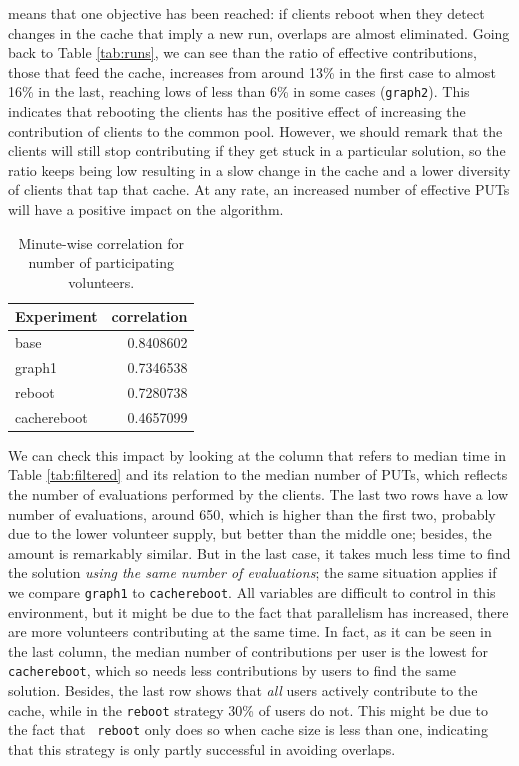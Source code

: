 \documentclass[runningheads,a4paper]{llncs}\usepackage[]{graphicx}\usepackage[]{color}
\newenvironment{knitrout}{}{} %
\begin{document}
means that one objective has been reached: if clients reboot when they
detect changes in the cache that imply a new run, overlaps are almost
eliminated. Going back to Table \ref{tab:runs}, we can see than the
ratio of effective contributions, those that feed the cache, increases
from around 13\% in the first case to almost 16\% in the last,
reaching lows of less than 6\% in some cases ({\tt graph2}). This
indicates that rebooting the clients has the positive effect of
increasing the contribution of clients to the common pool. However, we
should remark that the clients will still stop contributing if they
get stuck in a particular solution, so the ratio keeps being low
resulting in a slow change in the cache and a lower diversity of
clients that tap that cache. At any rate, an increased number of
effective PUTs will have a positive impact on the algorithm.

\begin{table}[htbp]
  \caption{Minute-wise correlation for number of participating volunteers. \label{tab:correlation}}
\begin{center}
\begin{knitrout}
\color{fgcolor}
\begin{tabular}{l|r}
\hline
Experiment & correlation\\
\hline
base & 0.8408602\\
\hline
graph1 & 0.7346538\\
\hline
reboot & 0.7280738\\
\hline
cachereboot & 0.4657099\\
\hline
\end{tabular}


\end{knitrout}
\end{center}
\end{table}
%
We can check this impact by looking at the column that refers to
median time in Table \ref{tab:filtered} and its relation to the median
number of PUTs, which reflects the number of evaluations performed by
the clients. The last two rows have a low number of evaluations,
around 650, which is higher than the first two, probably due to the
lower volunteer supply, but better than the middle one; besides, the
amount is remarkably similar. But in the last case, it takes much less
time to find the solution {\em using the same number of
  evaluations}; the same situation applies if we compare {\tt graph1}
to {\tt cachereboot}. All variables are difficult to control in this
environment, but it might be due to the fact that parallelism has
increased, there are more volunteers contributing at the same time. In
fact, as it can be seen in the last column, the median number of
contributions per user is the lowest for {\tt cachereboot}, which so needs less contributions by users to
find the same solution. Besides, the last row shows that {\em all}
users actively contribute to the cache, while in the {\tt reboot}
strategy 30\% of users do not. This might be due to the fact that {\tt
  reboot} only does so when cache size is less than one, indicating
that this strategy is only partly successful in avoiding overlaps.  
\end{document}
